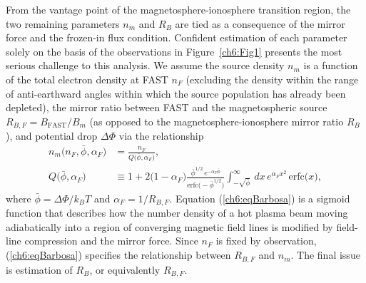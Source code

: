   From the vantage point of the magnetosphere-ionosphere transition
  region, the two remaining parameters $n_m$ and $R_B$ are tied as a
  consequence of the mirror force and the frozen-in flux
  condition. Confident estimation of each parameter solely on the
  basis of the observations in Figure~\ref{ch6:Fig1} presents the most
  serious challenge to this analysis. We assume the source density
  $n_m$ is a function of the total electron density at FAST $n_F$
  (excluding the density within the range of anti-earthward angles
  within which the source population has already been depleted), the
  mirror ratio between FAST and the magnetospheric source $R_{B,F} =
  B_\textrm{FAST} / B_m$ (as opposed to the magnetosphere-ionosphere
  mirror ratio $R_B$), and potential drop $\Delta \Phi$ via the
  relationship \citep{Ratner1976,Barbosa1977}
  \begin{subequations}
    \begin{align} n_m \big ( n_F, \bar{\phi}, \alpha_F \big ) &= \frac{n_F}{Q \big ( \bar{\phi}, \alpha_F \big ) }, \\
      Q \big ( \bar{\phi}, \alpha_F \big ) &\equiv 1 + 2 \big ( 1 -
      \alpha_F \big ) \frac{ \bar{\phi}^{1/2} \, e^{- \alpha_F
          \bar{\phi}} }{\textrm{erfc} \big ( - \bar{\phi}^{1/2} \big
        )} { \displaystyle \int_{-\sqrt{\bar{\phi}}}^{\infty} } \, dx
      \, e^{\alpha_F x^2} \, \textrm{erfc} \big ( x \big
      ), \label{ch6:eqBarbosa}
    \end{align}
  \end{subequations}
  where $\bar{\phi} = \Delta \Phi / k_B T $ and $\alpha_F = 1 /
  R_{B,F}$. Equation (\ref{ch6:eqBarbosa}) is a sigmoid function
  \citep[Figure 1b][]{Barbosa1977} that describes how the number
  density of a hot plasma beam moving adiabatically into a region of
  converging magnetic field lines is modified by field-line
  compression and the mirror force. Since $n_F$ is fixed by
  observation, (\ref{ch6:eqBarbosa}) specifies the relationship
  between $R_{B,F}$ and $n_m$. The final issue is estimation of $R_B$,
  or equivalently $R_{B,F}$.

